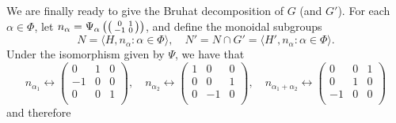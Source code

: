 We are finally ready to give the Bruhat decomposition of $G$ (and $G'$). For each $\alpha\in\Phi$, let $n_\alpha=\Psi_\alpha\left(\begin{psmallmatrix}
    0 & 1\\
    -1 & 0\\
\end{psmallmatrix}\right)$, and define the monoidal subgroups
$$N=\langle H,n_\alpha:\alpha\in\Phi\rangle,\quad N'=N\cap G'=\langle H',n_\alpha:\alpha\in\Phi\rangle.$$
Under the isomorphism given by $\Psi$, we have that 
\begin{equation*}
    n_{\alpha_1}\longleftrightarrow\begin{pmatrix}
        0 & 1 & 0\\
        -1 & 0 & 0\\
        0 & 0 & 1\\
    \end{pmatrix},\quad n_{\alpha_2}\longleftrightarrow\begin{pmatrix}
        1 & 0 & 0\\
        0 & 0 & 1\\
        0 & -1 & 0\\
    \end{pmatrix},\quad n_{\alpha_1+\alpha_2}\longleftrightarrow\begin{pmatrix}
        0 & 0 & 1\\
        0 & 1 & 0\\
        -1 & 0 & 0\\
    \end{pmatrix}
\end{equation*}
and therefore 
